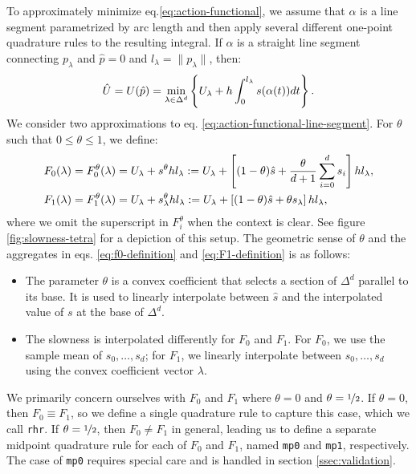 \documentclass[smallcondensed]{svjour3}
\begin{document}
To approximately minimize eq.\@ \ref{eq:action-functional}, we
assume that $\alpha$ is a line segment parametrized by arc length and
then apply several different one-point quadrature rules to the
resulting integral. If $\alpha$ is a straight line segment connecting
$p_\lambda$ and $\hat{p} = 0$ and $l_\lambda = \|p_\lambda\|$, then:
\begin{equation}
  \label{eq:action-functional-line-segment}
  \hat{U} = U(\hat{p}) = \min_{\lambda \in \Delta^d} \left\{U_\lambda + h \int_0^{l_\lambda} s(\alpha(t))dt\right\}.
\end{equation}
We consider two approximations to eq.\@
\ref{eq:action-functional-line-segment}. For $\theta$ such that
$0 \leq \theta \leq 1$, we define:
\begin{align}
  F_0(\lambda) = F_0^\theta(\lambda) &= U_\lambda + s^{\theta} h l_\lambda := U_\lambda + \left[(1-\theta)\hat{s} + \frac{\theta}{d + 1} \sum_{i=0}^d s_i\right] h l_\lambda, \label{eq:f0-definition} \\
  F_1(\lambda) = F_1^\theta(\lambda) &= U_\lambda + s^{\theta}_\lambda h l_\lambda := U_\lambda + \left[(1-\theta)\hat{s} + \theta s_\lambda\right] h l_\lambda, \label{eq:F1-definition}
\end{align}
where we omit the superscript in $F_i^\theta$ when the context is
clear. See figure \ref{fig:slowness-tetra} for a depiction of this
setup. The geometric sense of $\theta$ and the aggregates in eqs.\@
\ref{eq:f0-definition} and \ref{eq:F1-definition} is as follows:
\begin{itemize}
\item The parameter $\theta$ is a convex coefficient that selects a
  section of $\Delta^d$ parallel to its base. It is used to linearly
  interpolate between $\hat{s}$ and the interpolated value of $s$ at
  the base of $\Delta^d$.
\item The slowness is interpolated differently for $F_0$ and
  $F_1$. For $F_0$, we use the sample mean of $s_0, \hdots, s_d$; for
  $F_1$, we linearly interpolate between $s_0, \hdots, s_d$ using the
  convex coefficient vector $\lambda$.
\end{itemize}

We primarily concern ourselves with $F_0$ and $F_1$ where $\theta = 0$
and $\theta = \nicefrac{1}{2}$.  If $\theta = 0$, then
$F_0 \equiv F_1$, so we define a single quadrature rule to capture
this case, which we call \texttt{rhr}. If $\theta = \nicefrac{1}{2}$,
then $F_0 \neq F_1$ in general, leading us to define a separate
midpoint quadrature rule for each of $F_0$ and $F_1$, named
\texttt{mp0} and \texttt{mp1}, respectively. The case of \texttt{mp0}
requires special care and is handled in section\@
\ref{ssec:validation}.
\end{document}
